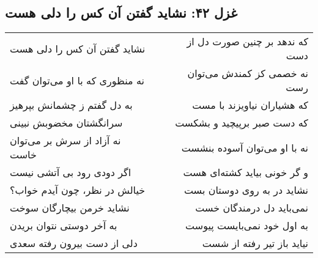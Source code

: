 \begin{center}
\section*{غزل ۴۲: نشاید گفتن آن کس را دلی هست}
\label{sec:042}
\begin{longtable}{l p{0.5cm} r}
نشاید گفتن آن کس را دلی هست
&&
که ندهد بر چنین صورت دل از دست
\\
نه منظوری که با او می‌توان گفت
&&
نه خصمی کز کمندش می‌توان رست
\\
به دل گفتم ز چشمانش بپرهیز
&&
که هشیاران نیاویزند با مست
\\
سرانگشتان مخضوبش نبینی
&&
که دست صبر برپیچید و بشکست
\\
نه آزاد از سرش بر می‌توان خاست
&&
نه با او می‌توان آسوده بنشست
\\
اگر دودی رود بی آتشی نیست
&&
و گر خونی بیاید کشته‌ای هست
\\
خیالش در نظر، چون آیدم خواب؟
&&
نشاید در به روی دوستان بست
\\
نشاید خرمن بیچارگان سوخت
&&
نمی‌باید دل درمندگان خست
\\
به آخر دوستی نتوان بریدن
&&
به اول خود نمی‌بایست پیوست
\\
دلی از دست بیرون رفته سعدی
&&
نیاید باز تیر رفته از شست
\\
\end{longtable}
\end{center}

